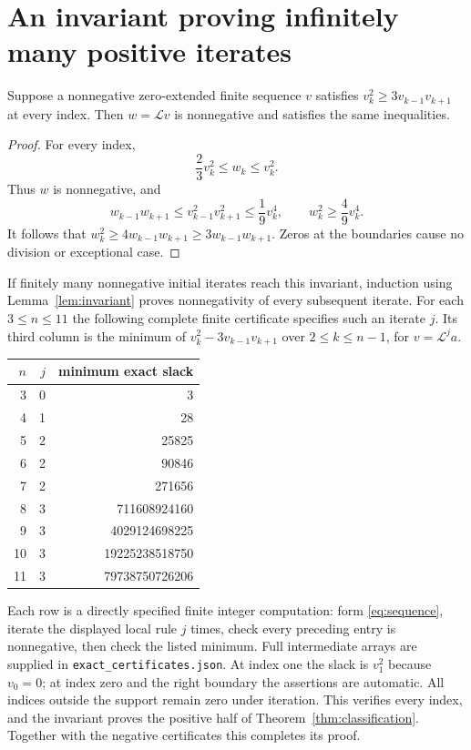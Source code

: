 \section{An invariant proving infinitely many positive iterates}
\begin{lemma}\label{lem:invariant}
Suppose a nonnegative zero-extended finite sequence $v$ satisfies
$v_k^2\ge3v_{k-1}v_{k+1}$ at every index. Then $w=\mathcal Lv$ is
nonnegative and satisfies the same inequalities.
\end{lemma}
\begin{proof}
For every index,
\[
 \frac23v_k^2\le w_k\le v_k^2.
\]
Thus $w$ is nonnegative, and
\[
 w_{k-1}w_{k+1}\le v_{k-1}^2v_{k+1}^2\le\frac19v_k^4,
 \qquad w_k^2\ge\frac49v_k^4.
\]
It follows that $w_k^2\ge4w_{k-1}w_{k+1}\ge3w_{k-1}w_{k+1}$.
Zeros at the boundaries cause no division or exceptional case.
\end{proof}
If finitely many nonnegative initial iterates reach this invariant, induction
using Lemma~\ref{lem:invariant} proves nonnegativity of every subsequent
iterate. For each $3\le n\le11$ the following complete finite certificate
specifies such an iterate $j$. Its third column is the minimum of
$v_k^2-3v_{k-1}v_{k+1}$ over $2\le k\le n-1$, for $v=\mathcal L^j a$.
\begin{center}
\begin{tabular}{rrr}
\toprule
$n$ & $j$ & minimum exact slack\\\midrule
3&0&3\\4&1&28\\5&2&25825\\6&2&90846\\7&2&271656\\
8&3&711608924160\\9&3&4029124698225\\
10&3&19225238518750\\11&3&79738750726206\\\bottomrule
\end{tabular}
\end{center}
Each row is a directly specified finite integer computation: form
\eqref{eq:sequence}, iterate the displayed local rule $j$ times, check every
preceding entry is nonnegative, then check the listed minimum. Full
intermediate arrays are supplied in \texttt{exact\_certificates.json}.
At index one the slack is $v_1^2$ because $v_0=0$; at index zero and the
right boundary the assertions are automatic. All indices outside the
support remain zero under iteration. This verifies every index, and the
invariant proves the positive half of Theorem~\ref{thm:classification}.
Together with the negative certificates this completes its proof.


